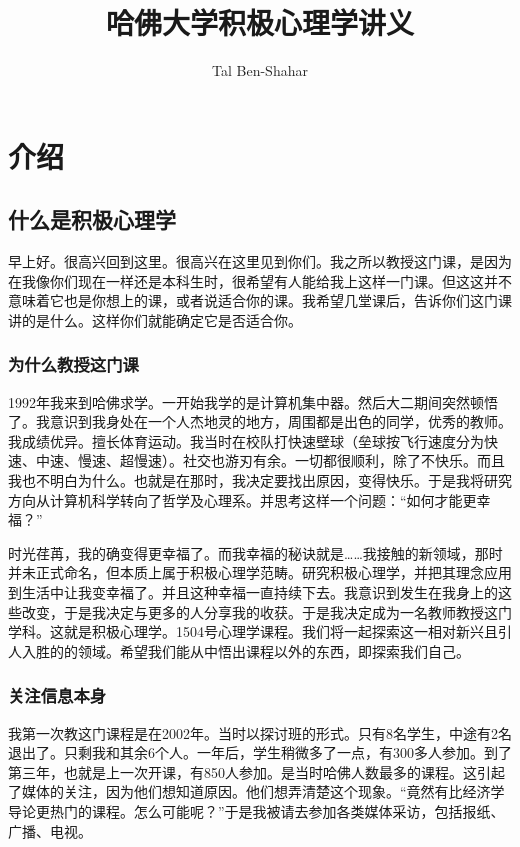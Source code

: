 \title{哈佛大学积极心理学讲义}
\author{Tal Ben-Shahar}
\maketitle
\tableofcontents

\section{介绍}
\subsection{什么是积极心理学}
早上好。很高兴回到这里。很高兴在这里见到你们。我之所以教授这门课，是因为在我像你们现在一样还是本科生时，很希望有人能给我上这样一门课。但这这并不意味着它也是你想上的课，或者说适合你的课。我希望几堂课后，告诉你们这门课讲的是什么。这样你们就能确定它是否适合你。

\subsubsection{为什么教授这门课}
1992年我来到哈佛求学。一开始我学的是计算机集中器。然后大二期间突然顿悟了。我意识到我身处在一个人杰地灵的地方，周围都是出色的同学，优秀的教师。我成绩优异。擅长体育运动。我当时在校队打快速壁球（垒球按飞行速度分为快速、中速、慢速、超慢速）。社交也游刃有余。一切都很顺利，除了不快乐。而且我也不明白为什么。也就是在那时，我决定要找出原因，变得快乐。于是我将研究方向从计算机科学转向了哲学及心理系。并思考这样一个问题：“如何才能更幸福？”

时光荏苒，我的确变得更幸福了。而我幸福的秘诀就是……我接触的新领域，那时并未正式命名，但本质上属于积极心理学范畴。研究积极心理学，并把其理念应用到生活中让我变幸福了。并且这种幸福一直持续下去。我意识到发生在我身上的这些改变，于是我决定与更多的人分享我的收获。于是我决定成为一名教师教授这门学科。这就是积极心理学。1504号心理学课程。我们将一起探索这一相对新兴且引人入胜的的领域。希望我们能从中悟出课程以外的东西，即探索我们自己。

\subsubsection{关注信息本身}
我第一次教这门课程是在2002年。当时以探讨班的形式。只有8名学生，中途有2名退出了。只剩我和其余6个人。一年后，学生稍微多了一点，有300多人参加。到了第三年，也就是上一次开课，有850人参加。是当时哈佛人数最多的课程。这引起了媒体的关注，因为他们想知道原因。他们想弄清楚这个现象。“竟然有比经济学导论更热门的课程。怎么可能呢？”于是我被请去参加各类媒体采访，包括报纸、广播、电视。


